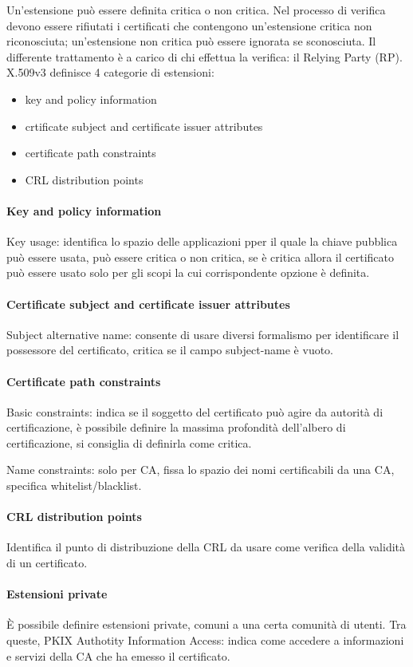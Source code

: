 \documentclass[11pt]{article}
\begin{document}
Un'estensione può essere definita critica o non critica. Nel processo di verifica devono essere rifiutati i certificati 
che contengono un'estensione critica non riconosciuta; un'estensione non critica può essere ignorata se sconosciuta. Il
differente trattamento è a carico di chi effettua la verifica: il Relying Party (RP).
X.509v3 definisce 4 categorie di estensioni:
\begin{itemize}
    \item key and policy information
    \item crtificate subject and certificate issuer attributes
    \item certificate path constraints
    \item CRL distribution points 
\end{itemize}
\paragraph*{Key and policy information}
Key usage: identifica lo spazio delle applicazioni pper il quale la chiave pubblica può essere usata, può essere critica 
o non critica, se è critica allora il certificato può essere usato solo per gli scopi la cui corrispondente opzione è definita.
\paragraph*{Certificate subject and certificate issuer attributes}
Subject alternative name: consente di usare diversi formalismo per identificare il possessore del certificato, critica se 
il campo subject-name è vuoto.
\paragraph*{Certificate path constraints}
Basic constraints: indica se il soggetto del certificato può agire da autorità di certificazione, è possibile definire la 
massima profondità dell'albero di certificazione, si consiglia di definirla come critica.

Name constraints: solo per CA, fissa lo spazio dei nomi certificabili da una CA, specifica whitelist/blacklist.
\paragraph*{CRL distribution points}
Identifica il punto di distribuzione della CRL da usare come verifica della validità di un certificato.
\paragraph*{Estensioni private}
È possibile definire estensioni private, comuni a una certa comunità di utenti. Tra queste, PKIX Authotity Information Access:
indica come accedere a informazioni e servizi della CA che ha emesso il certificato.
\end{document}
